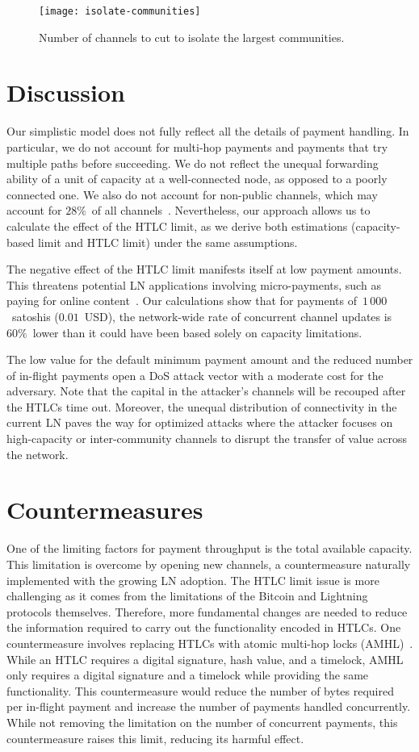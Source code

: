 \begin{figure}[tb]
	\centering
	\texttt{[image: isolate-communities]}
	\caption{Number of channels to cut to isolate the largest communities.}
	\label{fig:isolate-communities}
\end{figure}


\section{Discussion}
Our simplistic model does not fully reflect all the details of payment handling.
In particular, we do not account for multi-hop payments and payments that try multiple paths before succeeding.
We do not reflect the unequal forwarding ability of a unit of capacity at a well-connected node, as opposed to a poorly connected one.
We also do not account for non-public channels, which may account for $28\%$~of all channels~\cite{BitMEXPrivateChannels}.
Nevertheless, our approach allows us to calculate the effect of the HTLC limit, as we derive both estimations (capacity-based limit and HTLC limit)  under the same assumptions.

The negative effect of the HTLC limit manifests itself at low payment amounts.
This threatens potential LN applications involving micro-payments, such as paying for online content~\cite{Poon2016}.
Our calculations show that for payments of~$1\,000$~satoshis ($0.01$~USD), the network-wide rate of concurrent channel updates is $60\%$~lower than it could have been based solely on capacity limitations.

The low value for the default minimum payment amount and the reduced number of in-flight payments open a DoS attack vector with a moderate cost for the adversary.
Note that the capital in the attacker's channels will be recouped after the HTLCs time out.
Moreover, the unequal distribution of connectivity in the current LN paves the way for optimized attacks where the attacker focuses on high-capacity or inter-community channels to disrupt the transfer of value across the network.


\section{Countermeasures}
One of the limiting factors for payment throughput is the total available capacity.
This limitation is overcome by opening new channels, a countermeasure naturally implemented with the growing LN adoption.
The HTLC limit issue is more challenging as it comes from the limitations of the Bitcoin and Lightning protocols themselves.
Therefore, more fundamental changes are needed to reduce the information required to carry out the functionality encoded in HTLCs.
One countermeasure involves replacing HTLCs with atomic multi-hop locks (AMHL)~\cite{Malavolta2019}.
While an HTLC requires a digital signature, hash value, and a timelock, AMHL only requires a digital signature and a timelock while providing the same functionality.
This countermeasure would reduce the number of bytes required per in-flight payment and increase the number of payments handled concurrently.
While not removing the limitation on the number of concurrent payments, this countermeasure raises this limit, reducing its harmful effect.

